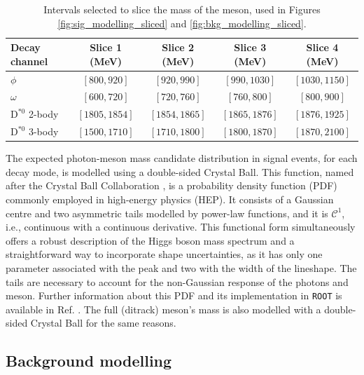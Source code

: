 \begin{table}[!ht]
    \centering
    \begin{tabular}{|l|c|c|c|c|}
        \hline
        \cellcolor{lightgray}Decay channel &\cellcolor{lightgray}Slice 1 (MeV)&\cellcolor{lightgray}Slice 2 (MeV)&\cellcolor{lightgray}Slice 3 (MeV)&\cellcolor{lightgray}Slice 4 (MeV)\\ \hline
        $\phi$                  &$[800, 920]$&$[920, 990]$&$[990, 1030]$&$[1030, 1150]$  \\
        $\omega$                &$[600, 720]$&$[720, 760]$&$[760, 800]$&$[800, 900]$  \\
        $\text{D}^{*0}$ 2-body  &$[1805, 1854]$&$[1854, 1865]$&$[1865, 1876]$&$[1876, 1925]$  \\
        $\text{D}^{*0}$ 3-body  &$[1500, 1710]$&$[1710, 1800]$&$[1800, 1870]$&$[1870, 2100]$  \\
        \hline
        \end{tabular}
    \caption{Intervals selected to slice the mass of the meson, used in Figures \ref{fig:sig_modelling_sliced} and \ref{fig:bkg_modelling_sliced}.}
    \label{tab:slice_values}
\end{table}

The expected photon-meson mass candidate distribution in signal events, for each decay mode, is modelled using a double-sided Crystal Ball. This function, named after the Crystal Ball Collaboration \cite{A2:CB}, is a probability density function (PDF) commonly employed in high-energy physics (HEP). It consists of a Gaussian centre and two asymmetric tails modelled by power-law functions, and it is $\mathcal{C}^{1}$, i.e., continuous with a continuous derivative. This functional form simultaneously offers a robust description of the Higgs boson mass spectrum and a straightforward way to incorporate shape uncertainties, as it has only one parameter associated with the peak and two with the width of the lineshape. The tails are necessary to account for the non-Gaussian response of the photons and meson. Further information about this PDF and its implementation in \verb+ROOT+ is available in Ref. \cite{CERN:root_CB}. The full (ditrack) meson's mass is also modelled with a double-sided Crystal Ball for the same reasons.

\subsection{Background modelling}

